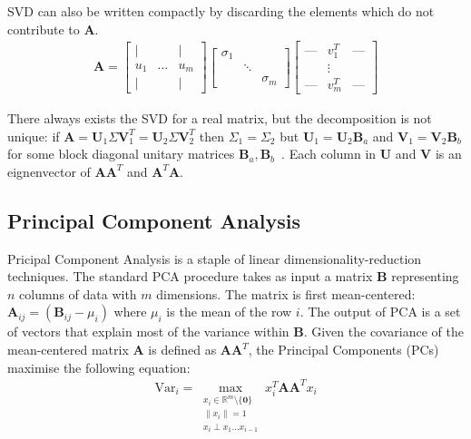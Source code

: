 SVD can also be written compactly by discarding the elements which do not
contribute to $\mathbf{A}$.
\begin{align}
\mathbf{A} = \begin{bmatrix} \mid & & \mid \\ u_1 & \ldots & u_m
\\ \mid & & \mid  \end{bmatrix} \begin{bmatrix} \sigma_1 &
        & \\ & \ddots & \\ & & \sigma_m \end{bmatrix} \begin{bmatrix} \text{---}
& v_1^T & \text{---} \\ & \vdots & \\ \text{---} & v_m^T & \text{---}
\end{bmatrix}
\end{align}

There always exists the SVD for a real matrix, but the decomposition is not
unique: if $\mathbf{A} = \mathbf{U}_1\Sigma\mathbf{V}_1^T =
\mathbf{U}_2\Sigma\mathbf{V}_2^T$ then $\Sigma_1 = \Sigma_2$ but $\mathbf{U}_1 =
\mathbf{U}_2\mathbf{B}_a$ and $\mathbf{V}_1 = \mathbf{V}_2\mathbf{B}_b$ for some
block diagonal unitary matrices $\mathbf{B}_a,
\mathbf{B}_b$~\cite{eftekhari2019moses, Strang2009}. Each column in
$\mathbf{U}$ and $\mathbf{V}$ is an eignenvector of $\mathbf{AA}^T$ and
$\mathbf{A}^T\mathbf{A}$.

\subsection{Principal Component Analysis}
Pricipal Component Analysis is a staple of linear dimensionality-reduction
techniques. The standard PCA procedure takes as input a matrix $\mathbf{B}$
representing $n$ columns of data with $m$ dimensions. The matrix is first
mean-centered: $\mathbf{A}_{ij} = (\mathbf{B}_{ij} - \mu_i)$ where $\mu_i$ is
the mean of the row $i$. The output of PCA is a set of vectors that explain most
of the variance within $\mathbf{B}$. Given the covariance of the mean-centered
matrix $\mathbf{A}$ is defined as $\mathbf{AA}^T$, the Principal Components (PCs)
maximise the following equation:
\begin{align}
\text{Var}_i = \max_{\substack{x_i \in \mathbb{R}^m \setminus \{\mathbf{0}\} \\
    \|x_i\|=1 \\ x_i \perp x_1 \dots x_{i-1}}} x_i^T \mathbf{A} \mathbf{A}^T x_i
\end{align}

